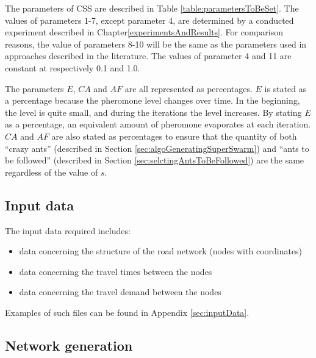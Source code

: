 The parameters of CSS are described in Table \vref{table:parametersToBeSet}. The values of parameters 1-7, except parameter 4, are determined by a conducted experiment described in Chapter\vref{experimentsAndResults}. For comparison reasons, the value of parameters 8-10 will be the same as the parameters used in approaches described in the literature\citep{mandl79, kechagiopoulos14, nikolic14,kidwai98,fan10,chakroborty02,zhang10,chew12,baaj91, mumford13}. The values of parameter 4 and 11 are constant at respectively 0.1 and 1.0.

The parameters $E$, $CA$ and $AF$ are all represented as percentages. $E$ is stated as a percentage because the pheromone level changes over time. In the beginning, the level is quite small, and during the iterations the level increases. By stating $E$ as a percentage, an equivalent amount of pheromone evaporates at each iteration. $CA$ and $AF$ are also stated as percentages to ensure that the quantity of both ``crazy ants'' (described in Section \vref{sec:algoGeneratingSuperSwarm}) and ``ants to be followed'' (described in Section \vref{sec:selctingAntsToBeFollowed}) are the same regardless of the value of $s$. 

\subsection{Input data}
The input data required includes:
\begin{itemize}
\item data concerning the structure of the road network (nodes with coordinates)
\item data concerning the travel times between the nodes
\item data concerning the travel demand between the nodes
\end{itemize}
Examples of such files can be found in Appendix \vref{sec:inputData}.

\subsection{Network generation}
\label{subsec:networkGeneration}

